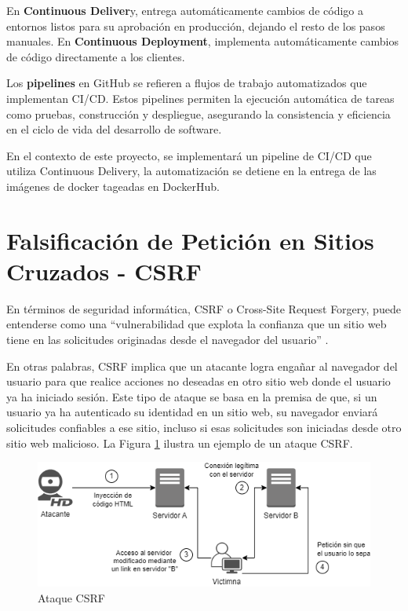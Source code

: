 En \textbf{Continuous Deliver}y, entrega automáticamente cambios de código a entornos listos para su aprobación en producción, dejando el resto de los pasos manuales.
En \textbf{Continuous Deployment}, implementa automáticamente cambios de código directamente a los clientes.

Los \textbf{pipelines} en GitHub se refieren a flujos de trabajo automatizados que implementan CI/CD. Estos pipelines permiten la ejecución automática de tareas como pruebas, construcción y despliegue, asegurando la consistencia y eficiencia en el ciclo de vida del desarrollo de software.

En el contexto de este proyecto, se implementará un pipeline de CI/CD que utiliza Continuous Delivery, la automatización se detiene en la entrega de las imágenes de docker tageadas en DockerHub.



\section{Falsificación de Petición en Sitios Cruzados - CSRF}\label{sec:csrf-attack}

En términos de seguridad informática, CSRF o Cross-Site Request Forgery, puede entenderse como una ``vulnerabilidad que explota la confianza que un sitio web tiene en las solicitudes originadas desde el navegador del usuario'' \cite{csrf}.

En otras palabras, CSRF implica que un atacante logra engañar al navegador del usuario para que realice acciones no deseadas en otro sitio web donde el usuario ya ha iniciado sesión. Este tipo de ataque se basa en la premisa de que, si un usuario ya ha autenticado su identidad en un sitio web, su navegador enviará solicitudes confiables a ese sitio, incluso si esas solicitudes son iniciadas desde otro sitio web malicioso. La Figura \ref{fig:csrf-attack} ilustra un ejemplo de un ataque CSRF.


\begin{figure}[h]
    \centering
    \includegraphics[width=0.9\linewidth]{fig/csrf.png}
    \caption{Ataque CSRF}
    \label{fig:csrf-attack}
\end{figure}


